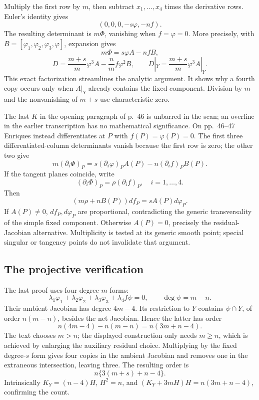 Multiply the first row by \(m\), then subtract \(x_1,\ldots,x_4\) times the derivative rows. Euler's identity gives \[
(0,0,0,-s\varphi,-nf).
\] The resulting determinant is \(m\Phi\), vanishing when \(f=\varphi=0\). More precisely, with \(B=[\varphi_1,\varphi_2,\varphi_3,\varphi]\), expansion gives \[
m\Phi=s\varphi A-nfB,
\] \[
D=\frac{m+s}{m}\varphi^3A-\frac nm f\varphi^2B,\qquad
D|_Y=\frac{m+s}{m}\varphi^3A|_Y.
\] This exact factorization streamlines the analytic argument. It shows why a fourth copy occurs only when \(A|_Y\) already contains the fixed component. Division by \(m\) and the nonvanishing of \(m+s\) use characteristic zero.

The last \(K\) in the opening paragraph of p.~46 is unbarred in the scan; an overline in the earlier transcription has no mathematical significance. On pp.~46--47 Enriques instead differentiates at \(P\) with \(f(P)=\varphi(P)=0\). The first three differentiated-column determinants vanish because the first row is zero; the other two give \[
m(\partial_i\Phi)_P=s(\partial_i\varphi)_P A(P)-n(\partial_i f)_P B(P).
\] If the tangent planes coincide, write \[
(\partial_i\Phi)_P=\rho(\partial_i f)_P,\quad i=1,\ldots,4.
\] Then \[
(m\rho+nB(P))df_P=sA(P)d\varphi_P.
\] If \(A(P)\ne0\), \(df_P,d\varphi_P\) are proportional, contradicting the generic transversality of the simple fixed component. Otherwise \(A(P)=0\), precisely the residual-Jacobian alternative. Multiplicity is tested at its generic smooth point; special singular or tangency points do not invalidate that argument.

\subsection{The projective verification}

The last proof uses four degree-\(m\) forms: \[
\lambda_1\varphi_1+\lambda_2\varphi_2+\lambda_3\varphi_3+\lambda_4f\psi=0,
\qquad\deg\psi=m-n.
\] Their ambient Jacobian has degree \(4m-4\). Its restriction to \(Y\) contains \(\psi\cap Y\), of order \(n(m-n)\), besides the net Jacobian. Hence the latter has order \[
n(4m-4)-n(m-n)=n(3m+n-4).
\] The text chooses \(m>n\); the displayed construction only needs \(m\ge n\), which is achieved by enlarging the auxiliary residual choice. Multiplying by the fixed degree-\(s\) form gives four copies in the ambient Jacobian and removes one in the extraneous intersection, leaving three. The resulting order is \[
n\{3(m+s)+n-4\}.
\] Intrinsically \(K_Y=(n-4)H\), \(H^2=n\), and \((K_Y+3mH)H=n(3m+n-4)\), confirming the count.

